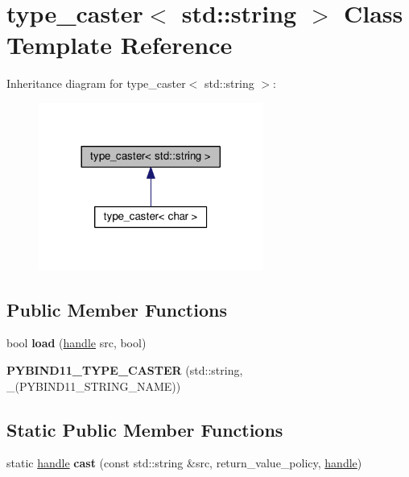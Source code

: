 \hypertarget{classtype__caster_3_01std_1_1string_01_4}{}\section{type\+\_\+caster$<$ std\+:\+:string $>$ Class Template Reference}
\label{classtype__caster_3_01std_1_1string_01_4}


Inheritance diagram for type\+\_\+caster$<$ std\+:\+:string $>$\+:
\nopagebreak
\begin{figure}[H]
\begin{center}
\leavevmode
\includegraphics[width=209pt]{classtype__caster_3_01std_1_1string_01_4__inherit__graph}
\end{center}
\end{figure}
\subsection*{Public Member Functions}
\begin{DoxyCompactItemize}
\item 
bool {\bfseries load} (\hyperlink{classhandle}{handle} src, bool)\hypertarget{classtype__caster_3_01std_1_1string_01_4_a3fbea125a523c032e84179a53ea4d8a9}{}\label{classtype__caster_3_01std_1_1string_01_4_a3fbea125a523c032e84179a53ea4d8a9}

\item 
{\bfseries P\+Y\+B\+I\+N\+D11\+\_\+\+T\+Y\+P\+E\+\_\+\+C\+A\+S\+T\+ER} (std\+::string, \+\_\+(P\+Y\+B\+I\+N\+D11\+\_\+\+S\+T\+R\+I\+N\+G\+\_\+\+N\+A\+ME))\hypertarget{classtype__caster_3_01std_1_1string_01_4_af5faa0e6bd1baf8fd62e83017de6e4b1}{}\label{classtype__caster_3_01std_1_1string_01_4_af5faa0e6bd1baf8fd62e83017de6e4b1}

\end{DoxyCompactItemize}
\subsection*{Static Public Member Functions}
\begin{DoxyCompactItemize}
\item 
static \hyperlink{classhandle}{handle} {\bfseries cast} (const std\+::string \&src, return\+\_\+value\+\_\+policy, \hyperlink{classhandle}{handle})\hypertarget{classtype__caster_3_01std_1_1string_01_4_a39033d4e873debaa6cf6f728a840a335}{}\label{classtype__caster_3_01std_1_1string_01_4_a39033d4e873debaa6cf6f728a840a335}

\end{DoxyCompactItemize}
